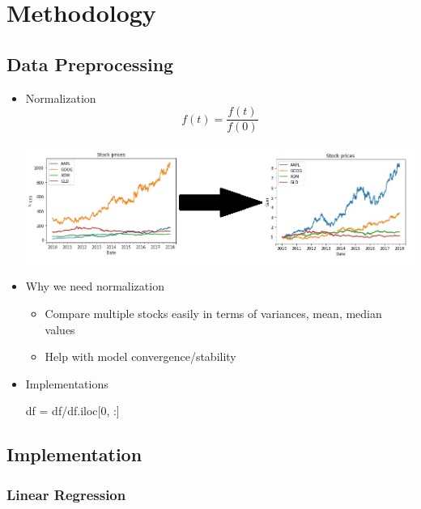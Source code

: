 \documentclass[11pt]{article}
\makeatletter
\def\maxwidth{\ifdim\Gin@nat@width>\linewidth\linewidth
    \else\Gin@nat@width\fi}
\let\Oldincludegraphics\includegraphics
\renewcommand{\includegraphics}[1]{\Oldincludegraphics[width=.8\maxwidth]{#1}}
\providecommand{\tightlist}{%
      \setlength{\itemsep}{0pt}\setlength{\parskip}{0pt}}
\newenvironment{Shaded}{}{}
\newcommand{\DecValTok}[1]{\textcolor[rgb]{0.25,0.63,0.44}{{#1}}}
\newcommand{\NormalTok}[1]{{#1}}
\newcommand{\OperatorTok}[1]{\textcolor[rgb]{0.40,0.40,0.40}{{#1}}}
\makeatother
\begin{document}
\section{Methodology}\label{methodology}

\subsection{Data Preprocessing}\label{data-preprocessing}

\begin{itemize}
\item
  Normalization \[f(t) = \frac{f(t)}{f(0)}\] \\
  \includegraphics{./figures/13.jpg}
\item
  Why we need normalization

  \begin{itemize}
  \tightlist
  \item
    Compare multiple stocks easily in terms of variances, mean, median
    values
  \item
    Help with model convergence/stability
  \end{itemize}
\item
  Implementations

\begin{Shaded}
\begin{Highlighting}[]
\NormalTok{df }\OperatorTok{=}\NormalTok{ df}\OperatorTok{/}\NormalTok{df.iloc[}\DecValTok{0}\NormalTok{, :]}
\end{Highlighting}
\end{Shaded}
\end{itemize}

\subsection{Implementation}\label{implementation}

\subsubsection{Linear Regression}\label{linear-regression}
\end{document}
